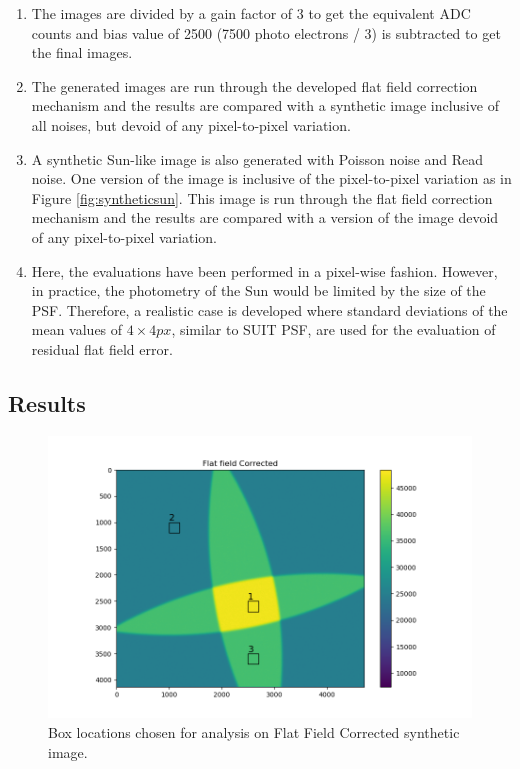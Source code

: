 \documentclass[11pt,a4paper]{article}
\begin{document}
\begin{enumerate}
				\item The images are divided by a gain factor of 3 to get the equivalent ADC counts and bias value of 2500 (7500 photo electrons / 3) is subtracted to get the final images.
				
				\item The generated images are run through the developed flat field correction mechanism and the results are compared with a synthetic image inclusive of all noises, but devoid of any pixel-to-pixel variation.
				
				\item A synthetic Sun-like image is also generated with Poisson noise and Read noise. One version of the image is inclusive of the pixel-to-pixel variation as in Figure \ref{fig:syntheticsun}. This image is run through the flat field correction mechanism and the results are compared with a version of the image devoid of any pixel-to-pixel variation.
				
				\item Here, the evaluations have been performed in a pixel-wise fashion. However, in practice, the photometry of the Sun would be limited by the size of the PSF. Therefore, a realistic case is developed where standard deviations of the mean values of $4\times4 px$, similar to SUIT PSF, are used for the evaluation of residual flat field error. 
			\end{enumerate}
		
		
	
	\subsection{Results}
	\begin{figure}
		\centering
		\includegraphics[width=0.6\linewidth]{pics/analysis_locations.png}
		\caption{Box locations chosen for analysis on Flat Field Corrected synthetic image.}
		\label{fig:analysislocations}
	\end{figure}
	
\end{document}

